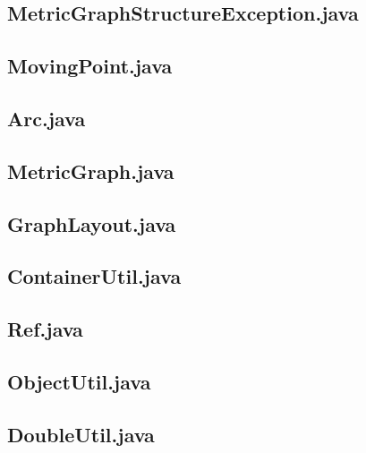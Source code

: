 \documentclass{../TechDoc}
\begin{document}
	\subsection{MetricGraphStructureException.java}
	
	\subsection{MovingPoint.java}
	
	\subsection{Arc.java}
	
	\subsection{MetricGraph.java}
	
	\subsection{GraphLayout.java}
	
	\subsection{ContainerUtil.java}
	
	\subsection{Ref.java}
	
	\subsection{ObjectUtil.java}
	
	\subsection{DoubleUtil.java}
	
\end{document}
